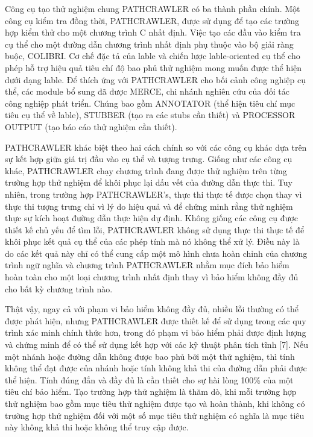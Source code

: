 \documentclass[12pt,a4paper]{article}
\begin{document}
Công cụ tạo thử nghiệm chung PATHCRAWLER có ba thành phần chính. Một công cụ kiểm tra đồng thời, PATHCRAWLER, được sử dụng để tạo các trường hợp kiểm thử cho một chương trình C nhất định. Việc tạo các đầu vào kiểm tra cụ thể cho một đường dẫn chương trình nhất định phụ thuộc vào bộ giải ràng buộc, COLIBRI. Cơ chế đặc tả của lable và chiến lược lable-oriented cụ thể cho phép hỗ trợ hiệu quả tiêu chí độ bao phủ thử nghiệm mong muốn được thể hiện dưới dạng lable. Để thích ứng với PATHCRAWLER cho bối cảnh công nghiệp cụ thể, các module bổ sung đã được MERCE, chi nhánh nghiên cứu của đối tác công nghiệp phát triển. Chúng bao gồm ANNOTATOR (thể hiện tiêu chí mục tiêu cụ thể về lable), STUBBER (tạo ra các stubs cần thiết) và PROCESSOR OUTPUT (tạo báo cáo thử nghiệm cần thiết).

\indent PATHCRAWLER khác biệt theo hai cách chính so với các công cụ khác dựa trên sự kết hợp giữa giá trị đầu vào cụ thể và tượng trưng. Giống như các công cụ khác, PATHCRAWLER chạy chương trình đang được thử nghiệm trên từng trường hợp thử nghiệm để khôi phục lại dấu vết của đường dẫn thực thi. Tuy nhiên, trong trường hợp PATHCRAWLER's, thực thi thực tế được chọn thay vì thực thi tượng trưng chỉ vì lý do hiệu quả và để chứng minh rằng thử nghiệm thực sự kích hoạt đường dẫn thực hiện dự định. Không giống
các công cụ được thiết kế chủ yếu để tìm lỗi, PATHCRAWLER không sử dụng thực thi thực tế để khôi phục kết quả cụ thể của các phép tính mà nó không thể xử lý. Điều này là do các kết quả này chỉ có thể cung cấp một mô hình chưa hoàn chỉnh của chương trình ngữ nghĩa và chương trình PATHCRAWLER nhằm mục đích bảo hiểm hoàn toàn cho một loại chương trình nhất định thay vì bảo hiểm không đầy đủ cho bất kỳ chương trình nào.

\indent Thật vậy, ngay cả với phạm vi bảo hiểm không đầy đủ, nhiều lỗi thường có thể được phát hiện, nhưng PATHCRAWLER được thiết kế để sử dụng trong các quy trình xác minh chính thức hơn, trong đó phạm vi bảo hiểm phải được định lượng và chứng minh để có thể sử dụng kết hợp với các kỹ thuật phân tích tĩnh [7]. Nếu một nhánh hoặc đường dẫn không được bao phủ bởi một thử nghiệm, thì tính không thể đạt được của nhánh hoặc tính không khả thi của đường dẫn phải được thể hiện. Tính đúng đắn và đầy đủ là cần thiết cho sự hài lòng 100\% của một tiêu chí bảo hiểm. Tạo trường hợp thử nghiệm là thăm dò, khi mỗi trường hợp thử nghiệm bao gồm mục tiêu thử nghiệm được tạo và hoàn thành, khi không có trường hợp thử nghiệm đối với một số mục tiêu thử nghiệm có nghĩa là mục tiêu này không khả thi hoặc không thể truy cập được.
\end{document}

